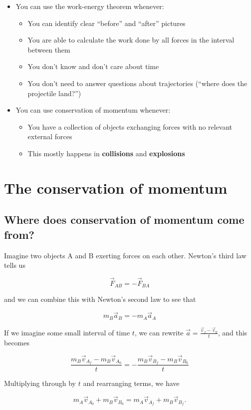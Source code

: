 \documentclass[10pt]{article}
\begin{document}
\begin{itemize}
\item You can use the work-energy theorem whenever:
\begin{itemize}
\item You can identify clear ``before'' and ``after'' pictures
\item You are able to calculate the work done by all forces in the interval between them
\item You don't know and don't care about time
\item You don't need to answer questions about trajectories (``where does the projectile land?'')
\end{itemize}
\item You can use conservation of momentum whenever:
\begin{itemize}
\item You have a collection of objects exchanging forces with no relevant external forces
\item This mostly happens in {\bf collisions} and {\bf explosions}
\end{itemize}
\end{itemize}


\section{The conservation of momentum}

\subsection{Where does conservation of momentum come from?}

Imagine two objects A and B exerting forces on each other. Newton's third law tells us

$$\vec F_{AB} = -\vec F_{BA}$$

and we can combine this with Newton's second law to see that 

$$m_B\vec a_B = -m_A\vec a_A$$

If we imagine some small interval of time $t$, we can rewrite $\vec a = \frac{\vec v_f - \vec v_0}{t}$, and this becomes

$$\frac{m_B\vec v_{A_f} - m_B\vec v_{A_0}}{t} = - \frac{m_B\vec v_{B_f} - m_B\vec v_{B_0}}{t}$$

Multiplying through by $t$ and rearranging terms, we have

\begin{equation}
m_A\vec v_{A_0} + m_B\vec v_{B_0} = m_A\vec v_{A_f} + m_B\vec v_{B_f}.
\end{equation}
\end{document}
